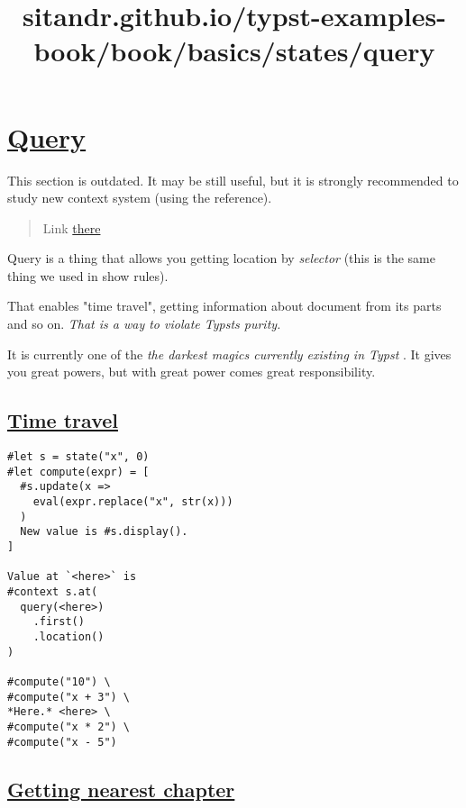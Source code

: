\title{sitandr.github.io/typst-examples-book/book/basics/states/query}

\section{\texorpdfstring{\hyperref[query]{Query}}{Query}}\label{query}

This section is outdated. It may be still useful, but it is strongly
recommended to study new context system (using the reference).

\begin{quote}
Link \href{https://typst.app/docs/reference/meta/query/}{there}
\end{quote}

Query is a thing that allows you getting location by \emph{selector}
(this is the same thing we used in show rules).

That enables "time travel", getting information about document from its
parts and so on. \emph{That is a way to violate Typst\textquotesingle s
purity.}

It is currently one of the \emph{the darkest magics currently existing
in Typst} . It gives you great powers, but with great power comes great
responsibility.

\subsection{\texorpdfstring{\hyperref[time-travel]{Time
travel}}{Time travel}}\label{time-travel}

\begin{verbatim}
#let s = state("x", 0)
#let compute(expr) = [
  #s.update(x =>
    eval(expr.replace("x", str(x)))
  )
  New value is #s.display().
]

Value at `<here>` is
#context s.at(
  query(<here>)
    .first()
    .location()
)

#compute("10") \
#compute("x + 3") \
*Here.* <here> \
#compute("x * 2") \
#compute("x - 5")
\end{verbatim}

\pandocbounded{}

\subsection{\texorpdfstring{\hyperref[getting-nearest-chapter]{Getting
nearest
chapter}}{Getting nearest chapter}}\label{getting-nearest-chapter}

